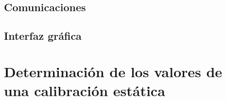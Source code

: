 		\subsection{Comunicaciones}
			
			
		\subsection{Interfaz gr\'afica}
			
			
	\section{Determinación de los valores de una calibración estática}\label{anx: staticCalibration}
		